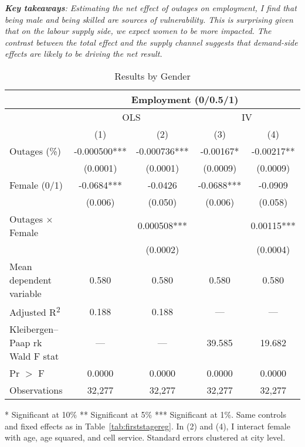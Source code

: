 \documentclass[12pt]{article}
\begin{document}
\par \noindent
\textit{\textbf{Key takeaways}: Estimating the net effect of outages on employment, I find that being male and being skilled are sources of vulnerability. This is surprising given that on the labour supply side, we expect women to be more impacted. The contrast between the total effect and the supply channel suggests that demand-side effects are likely to be driving the net result.}

\newpage
\begin{table}[htbp]
\centering
\footnotesize
\caption{Results by Gender}
\label{tab:mainresults}
\begin{tabular}{lcccc}
\hline\hline
& \multicolumn{4}{c}{Employment (0/0.5/1)} \\
\midrule
& \multicolumn{2}{c}{OLS} & \multicolumn{2}{c}{IV} \\
& (1) & (2) & (3) & (4) \\
\midrule
Outages (\%) 
  & -0.000500*** 
  & -0.000736*** 
  & -0.00167* 
  & -0.00217** \\
& (0.0001) & (0.0001) & (0.0009) & (0.0009) \\[6pt]
Female (0/1)
  & -0.0684***  
  & -0.0426 
  & -0.0688***  
  & -0.0909 \\
& (0.006) & (0.050) & (0.006) & (0.058) \\[6pt]
Outages $\times$ Female
  &  
  & 0.000508***
  &  
  &  0.00115*** \\
&  & (0.0002) &  & (0.0004) \\[6pt]
\midrule
Mean dependent variable
  & 0.580 
  &  0.580  
  & 0.580 
  & 0.580 \\
Adjusted R\textsuperscript{2}
  & 0.188 
  &  0.188  
  & --- 
  & --- \\
Kleibergen--Paap rk Wald F stat
  & --- 
  & ---
  & 39.585 
  & 19.682 \\
Pr $>$ F & 0.0000 & 0.0000 & 0.0000 & 0.0000 \\
Observations 
  & 32,277  
  & 32,277  
  & 32,277
  & 32,277\\
\midrule
\bottomrule
\end{tabular}
\end{table}
\begin{flushleft}
\footnotesize
* Significant at 10\% ** Significant at 5\% *** Significant at 1\%. Same controls and fixed effects as in Table~\ref{tab:firststagereg}. In (2) and (4), I interact female with age, age squared, and cell service. Standard errors clustered at city level. 
\end{flushleft}
\end{document}
